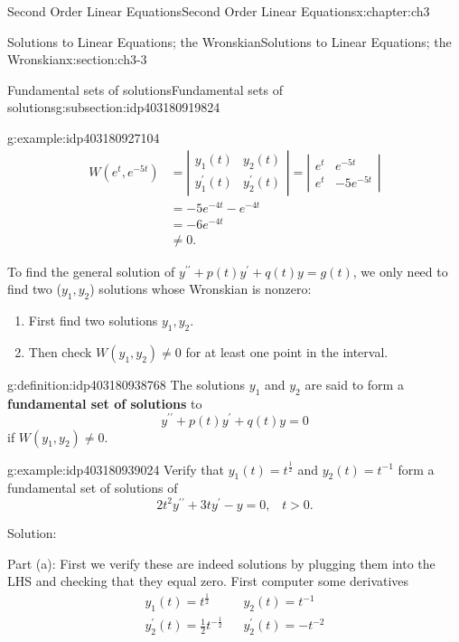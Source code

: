 \documentclass[oneside,10pt,]{book}
\newcommand{\terminology}[1]{\textbf{#1}}
\numberwithin{equation}{section}
\numberwithin{equation}{section}
\newcommand{\amp}{&}
\begin{document}
\begin{chapterptx}{Second Order Linear Equations}{}{Second Order Linear Equations}{}{}{x:chapter:ch3}
\begin{sectionptx}{Solutions to Linear Equations; the Wronskian}{}{Solutions to Linear Equations; the Wronskian}{}{}{x:section:ch3-3}
\begin{subsectionptx}{Fundamental sets of solutions}{}{Fundamental sets of solutions}{}{}{g:subsection:idp403180919824}
\begin{example}{}{g:example:idp403180927104}
\begin{align*}
W\left(e^{t},e^{-5t}\right) \amp =\left|\begin{array}{cc}
y_{1}(t) \amp y_{2}(t)\\
y_{1}^{\prime}(t) \amp y_{2}^{\prime}(t)
\end{array}\right|=\left|\begin{array}{cc}
e^{t} \amp e^{-5t}\\
e^{t} \amp -5e^{-5t}
\end{array}\right|\\
\amp =-5e^{-4t}-e^{-4t}\\
\amp =-6e^{-4t}\\
\amp \neq0.
\end{align*}
%
\end{example}
To find the general solution of \(y^{\prime\prime}+p(t)y^{\prime}+q(t)y=g(t)\), we only need to find two (\(y_{1},y_{2}\)) solutions whose Wronskian is nonzero:%
\begin{enumerate}
\item{}First find two solutions \(y_{1},y_{2}\).%
\item{}Then check \(W(y_{1},y_{2})\neq0\) for at least one point in the interval.%
\end{enumerate}
%
\begin{definition}{}{g:definition:idp403180938768}%
The solutions \(y_{1}\) and \(y_{2}\) are said to form a \terminology{fundamental set of solutions} to%
\begin{equation*}
y^{\prime\prime}+p(t)y^{\prime}+q(t)y=0
\end{equation*}
if \(W\left(y_{1},y_{2}\right)\neq0\).%
\end{definition}
\begin{example}{}{g:example:idp403180939024}%
Verify that \(y_{1}(t)=t^{\frac{1}{2}}\) and \(y_{2}(t)=t^{-1}\) form a fundamental set of solutions of%
\begin{equation*}
2t^{2}y^{\prime\prime}+3ty^{\prime}-y=0,\,\,\,\,\,t>0.
\end{equation*}
%
\par
Solution:%
\par
Part (a): First we verify these are indeed solutions by plugging them into the LHS and checking that they equal zero. First computer some derivatives%
\begin{equation*}
\begin{array}{ccc}
y_{1}(t)=t^{\frac{1}{2}} \amp  \amp y_{2}(t)=t^{-1}\\
y_{2}^{\prime}(t)=\frac{1}{2}t^{-\frac{1}{2}} \amp  \amp y_{2}^{\prime}(t)=-t^{-2}\\

\end{array}
\end{equation*}
\end{example}
\end{subsectionptx}
\end{sectionptx}
\end{chapterptx}
\end{document}
